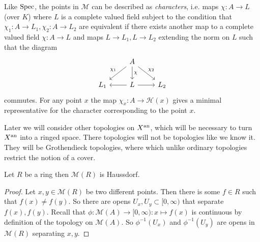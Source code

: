Like $\operatorname{Spec}$, the points in $\mathcal{M} $ can be described as \emph{characters}, i.e.  maps $\chi: A \to L$ (over $K$) where $L$ is a complete valued field subject to the condition that $\chi_1: A \to L_1, \chi_2: A \to L_2$ are equivalent if there exists another map to a complete valued field $\chi: A \to L$  and maps $L \to L_1, L \to L_2$ extending the norm on $L$ such that the diagram 
\[
\begin{tikzcd}
	& A \ar{dl}[']{\chi_1} \ar{dr}{\chi_2} \dar{\chi} \\
	L_1 & L \lar \rar & L_2
\end{tikzcd}
\] 
commutes. 
For any point $x$ the map $\chi_x: A \to \mathcal{H} (x)$ gives a minimal representative for the character corresponding to the point $x$. 


\begin{remark}
	Later we will consider other topologies on $X{}^{\text{an}}$, which will be necessary to turn $X{}^{\text{an}} $ into a ringed space. 
	There topologies will not be topologies like we know it. They will be Grothendieck topologies, where which unlike ordinary topologies restrict the notion of a cover. 
\end{remark}

\begin{proposition}\label{prop:spec_ring_haussdorf}
	Let $R$ be a ring then $\mathcal{M} (R)$ is Haussdorf. 
\end{proposition}
\begin{proof}
	Let $x, y \in \mathcal{M} (R)$ be two different points. 
	Then there is some $f \in R$ such that $f(x) \ne f(y)$. 
	So there are opens $U_x, U_y \subset  [0, \infty)$ that separate $f(x), f(y)$.
	Recall that $\phi: \mathcal{M} (A) \to [0, \infty): x \mapsto f(x)$ is continuous by definition of the topology on $\mathcal{M} (A)$. 
	So $\phi^{-1}(U_x)$ and $\phi^{-1}(U_y)$ are opens in $\mathcal{M} (R)$ separating $x,y$. 
\end{proof}


